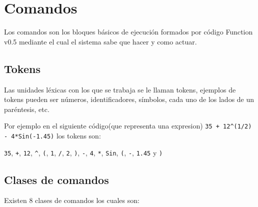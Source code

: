 \chapter{Comandos}
   Los comandos son los bloques básicos de ejecución formados por código Function v0.5 mediante el cual el sistema sabe que hacer y como actuar.
   
   \section{Tokens}
      Las unidades léxicas con los que se trabaja se le llaman tokens, ejemplos de tokens pueden ser números, identificadores, símbolos, cada uno de los lados de un paréntesis, etc.
      
      Por ejemplo en el siguiente código(que representa una expresion) \texttt{35 + 12\^{}(1/2) - 4*Sin(-1.45)} los tokens son:
      
      \texttt{35}, \texttt{+}, \texttt{12}, \texttt{\^{}}, \texttt{(}, \texttt{1}, \texttt{/}, \texttt{2}, \texttt{)}, \texttt{-}, \texttt{4}, \texttt{*}, \texttt{Sin}, \texttt{(}, \texttt{-}, \texttt{1.45} y \texttt{)}
      
   \section{Clases de comandos}
      Existen 8 clases de comandos los cuales son:
      
